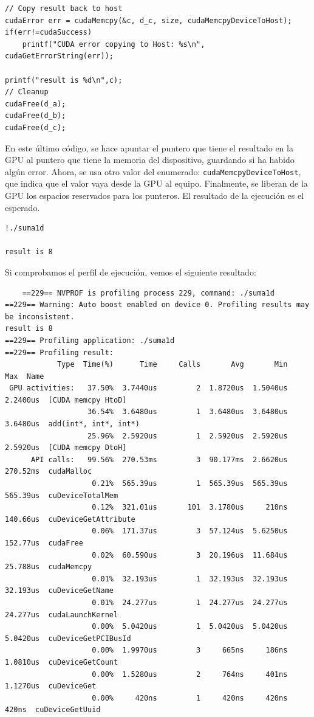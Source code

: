 \documentclass[11pt]{article}
\def\inline{\lstinline[basicstyle=\ttfamily,keywordstyle={}]}
\theoremstyle{plain}
\begin{document}
\begin{verbatim}
// Copy result back to host
cudaError err = cudaMemcpy(&c, d_c, size, cudaMemcpyDeviceToHost);
if(err!=cudaSuccess) 
	printf("CUDA error copying to Host: %s\n", cudaGetErrorString(err));

printf("result is %d\n",c);
// Cleanup
cudaFree(d_a);
cudaFree(d_b);
cudaFree(d_c);
\end{verbatim}

En este último código, se hace apuntar el puntero que tiene el resultado en la GPU al puntero que tiene la memoria del dispositivo, guardando si ha habido algún error. Ahora, se usa otro valor del enumerado: \inline{cudaMemcpyDeviceToHost}, que indica que el valor vaya desde la GPU al equipo. Finalmente, se liberan de la GPU los espacios reservados para los punteros. El resultado de la ejecución es el esperado.

\begin{verbatim}
!./suma1d

result is 8
\end{verbatim}

Si comprobamos el perfil de ejecución, vemos el siguiente resultado:

\begin{verbatim}
	==229== NVPROF is profiling process 229, command: ./suma1d
==229== Warning: Auto boost enabled on device 0. Profiling results may be inconsistent.
result is 8
==229== Profiling application: ./suma1d
==229== Profiling result:
            Type  Time(%)      Time     Calls       Avg       Min       Max  Name
 GPU activities:   37.50%  3.7440us         2  1.8720us  1.5040us  2.2400us  [CUDA memcpy HtoD]
                   36.54%  3.6480us         1  3.6480us  3.6480us  3.6480us  add(int*, int*, int*)
                   25.96%  2.5920us         1  2.5920us  2.5920us  2.5920us  [CUDA memcpy DtoH]
      API calls:   99.56%  270.53ms         3  90.177ms  2.6620us  270.52ms  cudaMalloc
                    0.21%  565.39us         1  565.39us  565.39us  565.39us  cuDeviceTotalMem
                    0.12%  321.01us       101  3.1780us     210ns  140.66us  cuDeviceGetAttribute
                    0.06%  171.37us         3  57.124us  5.6250us  152.77us  cudaFree
                    0.02%  60.590us         3  20.196us  11.684us  25.788us  cudaMemcpy
                    0.01%  32.193us         1  32.193us  32.193us  32.193us  cuDeviceGetName
                    0.01%  24.277us         1  24.277us  24.277us  24.277us  cudaLaunchKernel
                    0.00%  5.0420us         1  5.0420us  5.0420us  5.0420us  cuDeviceGetPCIBusId
                    0.00%  1.9970us         3     665ns     186ns  1.0810us  cuDeviceGetCount
                    0.00%  1.5280us         2     764ns     401ns  1.1270us  cuDeviceGet
                    0.00%     420ns         1     420ns     420ns     420ns  cuDeviceGetUuid
\end{verbatim}
\end{document}

